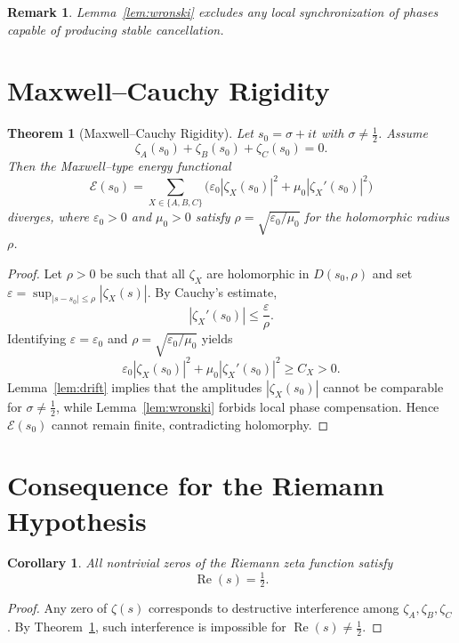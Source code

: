 \documentclass[11pt]{article}
\newtheorem{theorem}{Theorem}
\newtheorem{corollary}{Corollary}
\newtheorem{remark}{Remark}
\newcommand{\Rea}{\operatorname{Re}}
\newcommand{\zA}{\zeta_A}
\newcommand{\zB}{\zeta_B}
\newcommand{\zC}{\zeta_C}
\begin{document}
\begin{remark}
Lemma~\ref{lem:wronski} excludes any local synchronization of phases capable of
producing stable cancellation.
\end{remark}

\section{Maxwell--Cauchy Rigidity}

\begin{theorem}[Maxwell--Cauchy Rigidity]\label{thm:MC}
Let $s_0=\sigma+it$ with $\sigma\neq\tfrac12$.
Assume
\[
\zA(s_0)+\zB(s_0)+\zC(s_0)=0.
\]
Then the Maxwell--type energy functional
\[
\mathcal E(s_0)=
\sum_{X\in\{A,B,C\}}
\bigl(
\varepsilon_0|\zeta_X(s_0)|^2+
\mu_0|\zeta_X'(s_0)|^2
\bigr)
\]
diverges, where $\varepsilon_0>0$ and $\mu_0>0$ satisfy
$\rho=\sqrt{\varepsilon_0/\mu_0}$ for the holomorphic radius $\rho$.
\end{theorem}

\begin{proof}
Let $\rho>0$ be such that all $\zeta_X$ are holomorphic in $D(s_0,\rho)$ and set
$\varepsilon=\sup_{|s-s_0|\le\rho}|\zeta_X(s)|$.
By Cauchy's estimate,
\[
|\zeta_X'(s_0)|\le \frac{\varepsilon}{\rho}.
\]
Identifying $\varepsilon=\varepsilon_0$ and $\rho=\sqrt{\varepsilon_0/\mu_0}$
yields
\[
\varepsilon_0|\zeta_X(s_0)|^2+\mu_0|\zeta_X'(s_0)|^2\ge C_X>0.
\]
Lemma~\ref{lem:drift} implies that the amplitudes $|\zeta_X(s_0)|$ cannot be
comparable for $\sigma\neq\tfrac12$, while Lemma~\ref{lem:wronski} forbids local
phase compensation. Hence $\mathcal E(s_0)$ cannot remain finite, contradicting
holomorphy.
\end{proof}

\section{Consequence for the Riemann Hypothesis}

\begin{corollary}
All nontrivial zeros of the Riemann zeta function satisfy
\[
\Rea(s)=\tfrac12.
\]
\end{corollary}

\begin{proof}
Any zero of $\zeta(s)$ corresponds to destructive interference among
$\zA,\zB,\zC$. By Theorem~\ref{thm:MC}, such interference is impossible for
$\Rea(s)\neq\tfrac12$.
\end{proof}
\end{document}
